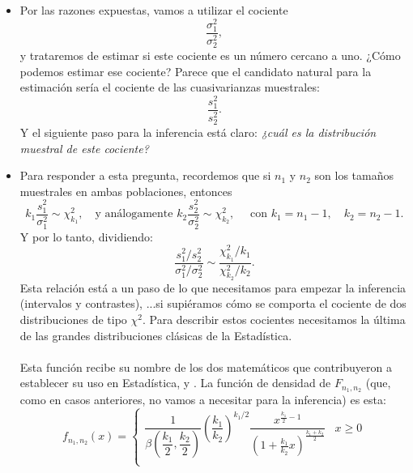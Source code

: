 \begin{itemize}
    \item Por las razones expuestas, vamos a utilizar el cociente
        \[\dfrac{\sigma_1^2}{\sigma_2^2},\]
        y trataremos de estimar si este cociente es un número cercano a uno. ¿Cómo podemos estimar ese cociente? Parece que el candidato natural para la estimación sería el cociente de las cuasivarianzas muestrales:
        \[\dfrac{s_1^2}{s_2^2}.\]
        Y el siguiente paso para la inferencia está claro: {\em ¿cuál es la distribución muestral de este cociente?}

    \item Para responder a esta pregunta, recordemos que si $n_1$ y $n_2$ son los tamaños muestrales en ambas poblaciones, entonces  \[k_1\dfrac{s_1^2}{\sigma_1^2}\sim\chi^2_{k_1},\quad\mbox{y análogamente }k_2\dfrac{s_2^2}{\sigma_2^2}\sim\chi^2_{k_2},\quad\mbox{ con }k_1=n_1-1,\quad k_2=n_2-1.\]
        Y por lo tanto, dividiendo:
        \[\dfrac{s_1^2/s_2^2}{\sigma_1^2/\sigma_2^2}\sim\dfrac{\chi^2_{k_1}/k_1}{\chi^2_{k_2}/k_2}.\]
        Esta relación está a un paso de lo que necesitamos para empezar la inferencia (intervalos y contrastes), ...si supiéramos cómo se comporta el cociente de dos distribuciones de tipo $\chi^2$. Para describir estos cocientes necesitamos la última de las grandes distribuciones clásicas de la Estadística.\\[3mm]
        \\[3mm]
        Esta función recibe su nombre de los dos matemáticos que contribuyeron a establecer su uso en Estadística,  y . La función de densidad de $F_{n_1,n_2}$ (que, como en casos anteriores, no vamos a necesitar para la inferencia) es esta:
        \[f_{n_1,n_2}(x)=
        \begin{cases}
        \dfrac{1}{\beta\left(\dfrac{k_1}{2},\dfrac{k_2}{2}\right)}\left(\dfrac{k_1}{k_2}\right)^{k_1/2}\dfrac{x^{\frac{k_1}{2}-1}}{\left(1+\frac{k_1}{k_2}x\right)^{\frac{k_1+k_2}{2}}}&x\geq 0\\[6mm]

\end{cases}\]
\end{itemize}
